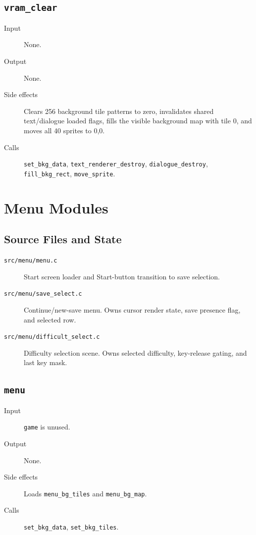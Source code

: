 \subsection*{\texttt{vram\_clear}}
\begin{description}
  \item[Input] None.
  \item[Output] None.
  \item[Side effects] Clears 256 background tile patterns to zero, invalidates shared text/dialogue loaded flags, fills the visible background map with tile 0, and moves all 40 sprites to 0,0.
  \item[Calls] \texttt{set\_bkg\_data}, \texttt{text\_renderer\_destroy}, \texttt{dialogue\_destroy}, \texttt{fill\_bkg\_rect}, \texttt{move\_sprite}.
\end{description}

\section{Menu Modules}

\subsection{Source Files and State}

\begin{description}
  \item[\texttt{src/menu/menu.c}] Start screen loader and Start-button transition to save selection.
  \item[\texttt{src/menu/save\_select.c}] Continue/new-save menu. Owns cursor render state, save presence flag, and selected row.
  \item[\texttt{src/menu/difficult\_select.c}] Difficulty selection scene. Owns selected difficulty, key-release gating, and last key mask.
\end{description}

\subsection*{\texttt{menu}}
\begin{description}
  \item[Input] \texttt{game} is unused.
  \item[Output] None.
  \item[Side effects] Loads \texttt{menu\_bg\_tiles} and \texttt{menu\_bg\_map}.
  \item[Calls] \texttt{set\_bkg\_data}, \texttt{set\_bkg\_tiles}.
\end{description}

